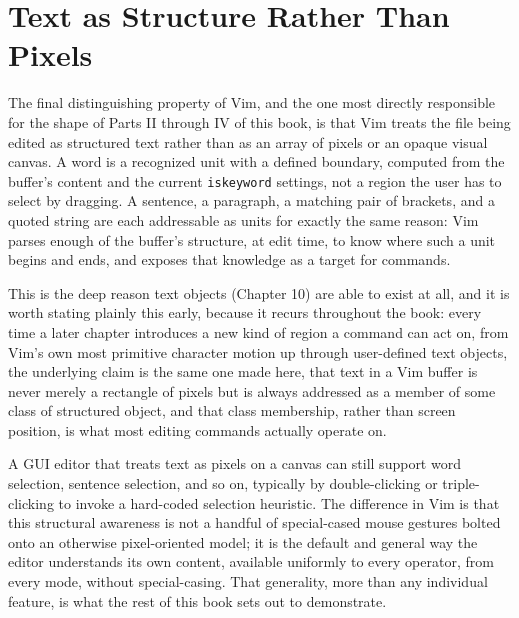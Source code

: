 \section{Text as Structure Rather Than Pixels}

The final distinguishing property of Vim, and the one most directly responsible for the shape of Parts II through IV of this book, is that Vim treats the file being edited as structured text rather than as an array of pixels or an opaque visual canvas. A word is a recognized unit with a defined boundary, computed from the buffer's content and the current \texttt{iskeyword} settings, not a region the user has to select by dragging. A sentence, a paragraph, a matching pair of brackets, and a quoted string are each addressable as units for exactly the same reason: Vim parses enough of the buffer's structure, at edit time, to know where such a unit begins and ends, and exposes that knowledge as a target for commands.

This is the deep reason text objects (Chapter 10) are able to exist at all, and it is worth stating plainly this early, because it recurs throughout the book: every time a later chapter introduces a new kind of region a command can act on, from Vim's own most primitive character motion up through user-defined text objects, the underlying claim is the same one made here, that text in a Vim buffer is never merely a rectangle of pixels but is always addressed as a member of some class of structured object, and that class membership, rather than screen position, is what most editing commands actually operate on.

A GUI editor that treats text as pixels on a canvas can still support word selection, sentence selection, and so on, typically by double-clicking or triple-clicking to invoke a hard-coded selection heuristic. The difference in Vim is that this structural awareness is not a handful of special-cased mouse gestures bolted onto an otherwise pixel-oriented model; it is the default and general way the editor understands its own content, available uniformly to every operator, from every mode, without special-casing. That generality, more than any individual feature, is what the rest of this book sets out to demonstrate.
